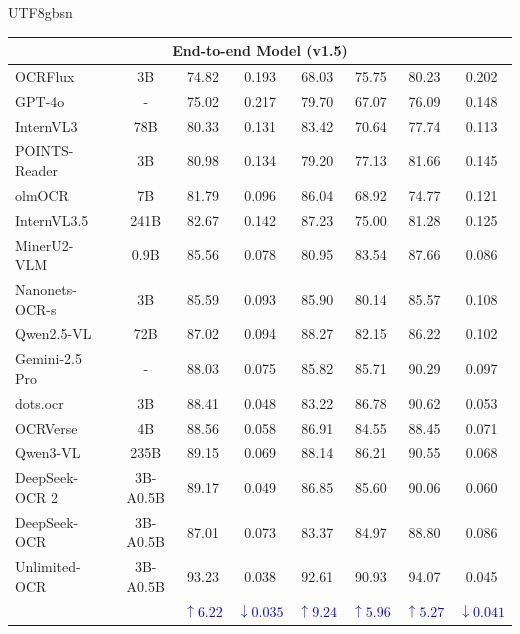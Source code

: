 \documentclass[11pt, a4paper, logo, copyright, nonumbering]{deepseek}
\begin{document}
\begin{CJK*}{UTF8}{gbsn}
\begin{table}[h]
{\begin{tabular}{l|c|c|ccccc}
\multicolumn{8}{c}{\textbf{    End-to-end Model (v1.5)}} \\ 
\midrule 
OCRFlux~\cite{ocrflux} &3B &74.82 & 0.193 & 68.03 & 75.75 & 80.23 & 0.202 \\
GPT-4o~\cite{GPT4} & - &75.02 & 0.217 & 79.70 & 67.07 & 76.09 & 0.148 \\
InternVL3~\cite{zhu2025internvl3} & 78B & 80.33 & 0.131 & 83.42 & 70.64 & 77.74  & 0.113 \\
POINTS-Reader~\cite{liu2025pointsreader}& 3B & 80.98 & 0.134 & 79.20 & 77.13 & 81.66 & 0.145 \\
olmOCR~\cite{poznanski2025olmocr}& 7B   & 81.79 & 0.096 & 86.04 & 68.92 & 74.77 & 0.121 \\
InternVL3.5~\cite{wang2025internvl35}& 241B & 82.67 & 0.142 & 87.23 & 75.00 & 81.28  & 0.125 \\
MinerU2-VLM~\cite{wang2024mineru} &0.9B & 85.56 & 0.078 & 80.95 & 83.54 & 87.66  & 0.086 \\
Nanonets-OCR-s~\cite{NanonetsOCRs}&3B&85.59 & 0.093 & 85.90 & 80.14 & 85.57  & 0.108 \\
Qwen2.5-VL~\cite{Qwen2.5-VL} & 72B & 87.02 & 0.094 & 88.27 & 82.15 & 86.22 & 0.102 \\
Gemini-2.5 Pro\cite{google_gemini_web}&- & 88.03 & 0.075 & 85.82 & 85.71 & 90.29 & 0.097 \\
dots.ocr~\cite{dots}&3B & 88.41 & 0.048 & 83.22 & 86.78 & 90.62 & 0.053 \\ 
OCRVerse~\cite{OCRVerse} &4B & 88.56 & 0.058 & 86.91 & 84.55 & 88.45 & 0.071 \\ 
Qwen3-VL\cite{bai2025qwen3vltechnicalreport}&235B & 89.15 & 0.069 & 88.14 & 86.21 & 90.55 & 0.068 \\ 
DeepSeek-OCR 2~\cite{wei2026deepseek}&3B-A0.5B & 89.17  & 0.049  & 86.85  & 85.60  & 90.06 &  0.060 \\ 

\midrule 
DeepSeek-OCR &3B-A0.5B & 87.01 & 0.073 & 83.37 & 84.97 & 88.80 & 0.086 \\ 

\rowcolor{gray!10}
Unlimited-OCR &3B-A0.5B & 93.23 & 0.038 & 92.61 & 90.93 & 94.07 & 0.045 \\ 


 & & \textcolor{blue}{$\uparrow 6.22$} &\textcolor{blue}{$\downarrow 0.035$} & \textcolor{blue}{$\uparrow 9.24$} & \textcolor{blue}{$\uparrow 5.96$} & \textcolor{blue}{$\uparrow 5.27$} & \textcolor{blue}{$\downarrow 0.041$} \\


\end{tabular}}
\end{table}
\end{CJK*}
\end{document}
